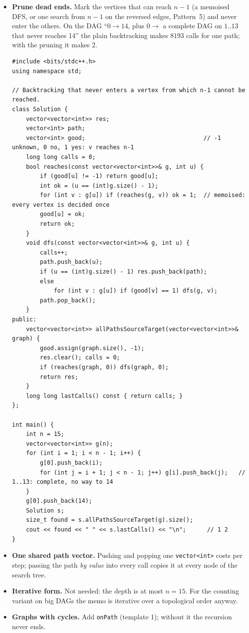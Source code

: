 \begin{tricksbox}
\begin{itemize}[leftmargin=*]
    \item \textbf{Prune dead ends.} Mark the vertices that can reach $n-1$ (a memoised DFS, or one search from $n-1$ on the reversed edges, Pattern~5) and never enter the others. On the DAG ``$0 \to 14$, plus $0 \to$ a complete DAG on $1..13$ that never reaches 14'' the plain backtracking makes $8193$ calls for one path; with the pruning it makes 2.
\begin{lstlisting}[style=cpp]
#include <bits/stdc++.h>
using namespace std;

// Backtracking that never enters a vertex from which n-1 cannot be reached.
class Solution {
    vector<vector<int>> res;
    vector<int> path;
    vector<int> good;                                  // -1 unknown, 0 no, 1 yes: v reaches n-1
    long long calls = 0;
    bool reaches(const vector<vector<int>>& g, int u) {
        if (good[u] != -1) return good[u];
        int ok = (u == (int)g.size() - 1);
        for (int v : g[u]) if (reaches(g, v)) ok = 1;  // memoised: every vertex is decided once
        good[u] = ok;
        return ok;
    }
    void dfs(const vector<vector<int>>& g, int u) {
        calls++;
        path.push_back(u);
        if (u == (int)g.size() - 1) res.push_back(path);
        else
            for (int v : g[u]) if (good[v] == 1) dfs(g, v);
        path.pop_back();
    }
public:
    vector<vector<int>> allPathsSourceTarget(vector<vector<int>>& graph) {
        good.assign(graph.size(), -1);
        res.clear(); calls = 0;
        if (reaches(graph, 0)) dfs(graph, 0);
        return res;
    }
    long long lastCalls() const { return calls; }
};

int main() {
    int n = 15;
    vector<vector<int>> g(n);
    for (int i = 1; i < n - 1; i++) {
        g[0].push_back(i);
        for (int j = i + 1; j < n - 1; j++) g[i].push_back(j);   // 1..13: complete, no way to 14
    }
    g[0].push_back(14);
    Solution s;
    size_t found = s.allPathsSourceTarget(g).size();
    cout << found << " " << s.lastCalls() << "\n";      // 1 2
}
\end{lstlisting}
    \item \textbf{One shared path vector.} Pushing and popping one \texttt{vector<int>} costs  per step; passing the path \emph{by value} into every call copies it at every node of the search tree.
    \item \textbf{Iterative form.} Not needed: the depth is at most $n = 15$. For the counting variant on big DAGs the memo is iterative over a topological order anyway.
    \item \textbf{Graphs with cycles.} Add \texttt{onPath} (template 1); without it the recursion never ends.
\end{itemize}
\end{tricksbox}

